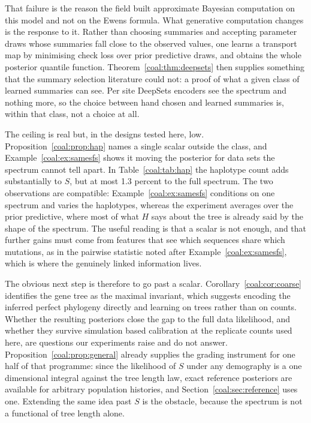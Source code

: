 That failure is the reason the field built approximate Bayesian computation on this model and not on the Ewens formula. What generative computation changes is the response to it. Rather than choosing summaries and accepting parameter draws whose summaries fall close to the observed values, one learns a transport map by minimising check loss over prior predictive draws, and obtains the whole posterior quantile function. Theorem~\ref{coal:thm:deepsets} then supplies something that the summary selection literature could not: a proof of what a given class of learned summaries can see. Per site DeepSets encoders see the spectrum and nothing more, so the choice between hand chosen and learned summaries is, within that class, not a choice at all.

The ceiling is real but, in the designs tested here, low. Proposition~\ref{coal:prop:hap} names a single scalar outside the class, and Example~\ref{coal:ex:samesfs} shows it moving the posterior for data sets the spectrum cannot tell apart. In Table~\ref{coal:tab:hap} the haplotype count adds substantially to $S$, but at most 1.3 percent to the full spectrum. The two observations are compatible: Example~\ref{coal:ex:samesfs} conditions on one spectrum and varies the haplotypes, whereas the experiment averages over the prior predictive, where most of what $H$ says about the tree is already said by the shape of the spectrum. The useful reading is that a scalar is not enough, and that further gains must come from features that see which sequences share which mutations, as in the pairwise statistic noted after Example~\ref{coal:ex:samesfs}, which is where the genuinely linked information lives.

The obvious next step is therefore to go past a scalar. Corollary~\ref{coal:cor:coarse} identifies the gene tree as the maximal invariant, which suggests encoding the inferred perfect phylogeny directly and learning on trees rather than on counts. Whether the resulting posteriors close the gap to the full data likelihood, and whether they survive simulation based calibration at the replicate counts used here, are questions our experiments raise and do not answer. Proposition~\ref{coal:prop:general} already supplies the grading instrument for one half of that programme: since the likelihood of $S$ under any demography is a one dimensional integral against the tree length law, exact reference posteriors are available for arbitrary population histories, and Section~\ref{coal:sec:reference} uses one. Extending the same idea past $S$ is the obstacle, because the spectrum is not a functional of tree length alone.

